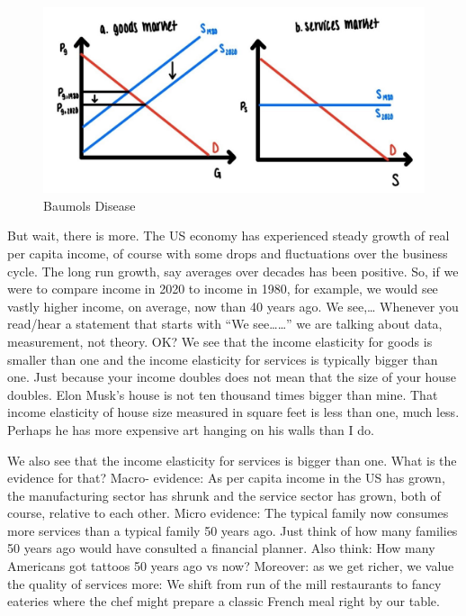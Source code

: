 \documentclass[
]{book}
\begin{document}
\begin{figure}

{\centering \includegraphics[width=1\linewidth]{img/compmarkets/fig12} 

}

\caption{Baumols Disease}\label{fig:compmarkets12}
\end{figure}

But wait, there is more.
The US economy has experienced steady growth of real per capita income, of course with some drops and fluctuations over the business cycle. The long run growth, say averages over decades has been positive. So, if we were to compare income in 2020 to income in 1980, for example, we would see vastly higher income, on average, now than 40 years ago.
We see,\ldots{}
Whenever you read/hear a statement that starts with ``We see\ldots\ldots{}'' we are talking about data, measurement, not theory. OK?
We see that the income elasticity for goods is smaller than one and the income elasticity for services is typically bigger than one. Just because your income doubles does not mean that the size of your house doubles. Elon Musk's house is not ten thousand times bigger than mine. That income elasticity of house size measured in square feet is less than one, much less. Perhaps he has more expensive art hanging on his walls than I do.

We also see that the income elasticity for services is bigger than one. What is the evidence for that? Macro- evidence: As per capita income in the US has grown, the manufacturing sector has shrunk and the service sector has grown, both of course, relative to each other. Micro evidence: The typical family now consumes more services than a typical family 50 years ago. Just think of how many families 50 years ago would have consulted a financial planner. Also think: How many Americans got tattoos 50 years ago vs now? Moreover: as we get richer, we value the quality of services more: We shift from run of the mill restaurants to fancy eateries where the chef might prepare a classic French meal right by our table.
\end{document}
